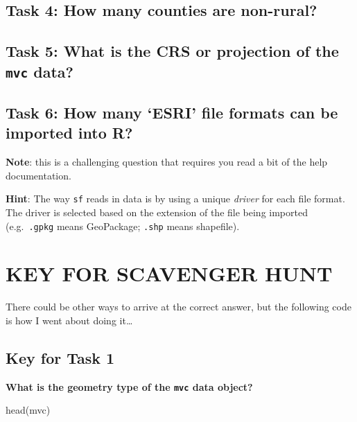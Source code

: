 \documentclass[
]{book}
\newenvironment{Shaded}{\begin{snugshade}}{\end{snugshade}}
\newcommand{\FunctionTok}[1]{\textcolor[rgb]{0.00,0.00,0.00}{#1}}
\newcommand{\NormalTok}[1]{#1}
\begin{document}
\hypertarget{task-4-how-many-counties-are-non-rural}{%
\subsection{Task 4: How many counties are non-rural?}\label{task-4-how-many-counties-are-non-rural}}

\hypertarget{task-5-what-is-the-crs-or-projection-of-the-mvc-data}{%
\subsection{\texorpdfstring{Task 5: What is the CRS or projection of the \texttt{mvc} data?}{Task 5: What is the CRS or projection of the mvc data?}}\label{task-5-what-is-the-crs-or-projection-of-the-mvc-data}}

\hypertarget{task-6-how-many-esri-file-formats-can-be-imported-into-r}{%
\subsection{Task 6: How many `ESRI' file formats can be imported into R?}\label{task-6-how-many-esri-file-formats-can-be-imported-into-r}}

\textbf{Note}: this is a challenging question that requires you read a bit of the help documentation.

\textbf{Hint}: The way \texttt{sf} reads in data is by using a unique \emph{driver} for each file format. The driver is selected based on the extension of the file being imported (e.g.~\texttt{.gpkg} means GeoPackage; \texttt{.shp} means shapefile).

\newpage

\hypertarget{key-for-scavenger-hunt}{%
\section{KEY FOR SCAVENGER HUNT}\label{key-for-scavenger-hunt}}

There could be other ways to arrive at the correct answer, but the following code is how I went about doing it\ldots{}

\hypertarget{key-for-task-1}{%
\subsection{Key for Task 1}\label{key-for-task-1}}

\textbf{What is the geometry type of the \texttt{mvc} data object?}

\begin{Shaded}
\begin{Highlighting}[]
\FunctionTok{head}\NormalTok{(mvc)}
\end{Highlighting}
\end{Shaded}
\end{document}
